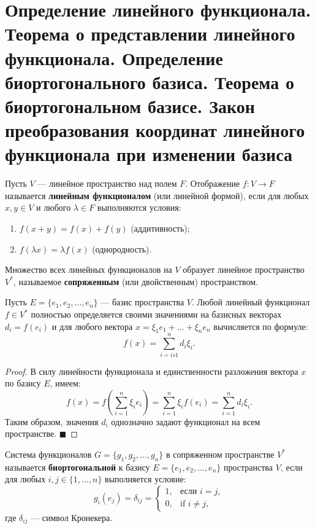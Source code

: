 \section{Определение линейного функционала. Теорема о представлении линейного функционала. Определение биортогонального базиса. Теорема о биортогональном базисе. Закон преобразования координат линейного функционала при изменении базиса}

\begin{definition}
Пусть $V$ --- линейное пространство над полем $F$. Отображение $f: V \to F$ называется \textbf{линейным функционалом} (или линейной формой), если для любых $x, y \in V$ и любого $\lambda \in F$ выполняются условия:
\begin{enumerate}
    \item $f(x + y) = f(x) + f(y)$ (аддитивность);
    \item $f(\lambda x) = \lambda f(x)$ (однородность).
\end{enumerate}
Множество всех линейных функционалов на $V$ образует линейное пространство $V^*$, называемое \textbf{сопряженным} (или двойственным) пространством.
\end{definition}

\begin{theorem}
Пусть $E = \{e_1, e_2, \dots, e_n\}$ --- базис пространства $V$. Любой линейный функционал $f \in V^*$ полностью определяется своими значениями на базисных векторах $d_i = f(e_i)$ и для любого вектора $x = \xi_1 e_1 + \dots + \xi_n e_n$ вычисляется по формуле:
\[
f(x) = \sum_{i= is 1}^n d_i \xi_i.
\]
\end{theorem}

\begin{proof}
В силу линейности функционала и единственности разложения вектора $x$ по базису $E$, имеем:
\[
f(x) = f\left(\sum_{i=1}^n \xi_i e_i\right) = \sum_{i=1}^n \xi_i f(e_i) = \sum_{i=1}^n d_i \xi_i.
\]
Таким образом, значения $d_i$ однозначно задают функционал на всем пространстве.
\hfill$\blacksquare$
\end{proof}

\begin{definition}
Система функционалов $G = \{g_1, g_2, \dots, g_n\}$ в сопряженном пространстве $V^*$ называется \textbf{биортогональной} к базису $E = \{e_1, e_2, \dots, e_n\}$ пространства $V$, если для любых $i, j \in \{1, \dots, n\}$ выполняется условие:
\[
g_i(e_j) = \delta_{ij} = \begin{cases} 
1, & \text{если } i = j, \\ 
0, & \text{if } i \neq j,
\end{cases}
\]
где $\delta_{ij}$ --- символ Кронекера.
\end{definition}

